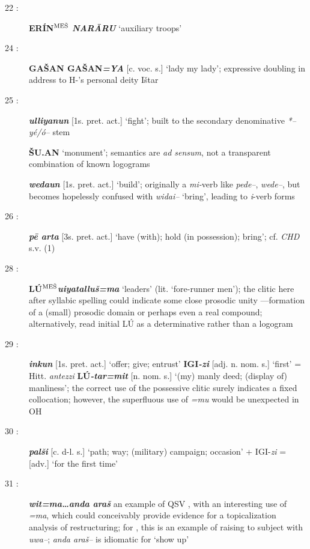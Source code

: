 \documentclass[10pt]{article}
\newcommand{\supersc}[1]{$^{\textrm{\scriptsize{#1}}}$}  	%
\newcommand{\bit}[1]{\textbf{\textit{#1}}}				%
\newcommand{\p}[1]{{\tiny[{#1}]}}					%
\newcommand{\hith}{\textsubwedge{h}}
\newcommand{\mpl}{\supersc{ME\v{S}}}
\newcommand{\troops}{ER\'IN\supersc{ME\v{S}}}
\renewcommand{\.}[1]{\textsubdot{#1}}
\begin{document}
\begin{description}
\item[22 :] \textbf{\troops} \bit{NAR\=ARU} `auxiliary troops'

\item[24 :] \textbf{GA\v{S}AN GA\v{S}AN}\bit{=YA} \p{c. voc. s.} `lady my lady'; expressive doubling in address to H-'s personal deity I\v{s}tar

\item[25 :] \bit{{\hith}ulliyanun} \p{1s. pret. act.} `fight'; built to the secondary denominative \textit{*--y\'e/\'o--} stem 

\textbf{\v{S}U.AN} `monument'; semantics are \textit{ad sensum}, not a transparent combination of known logograms

 \bit{weda{\hith\hith}un} \p{1s. pret. act.} `build'; originally a \textit{mi-}verb like \textit{pede--}, \textit{wede--}, but becomes hopelessly confused with \textit{widai--} `bring', leading to \textit{{\hith}i}-verb forms

\item[26 :] \bit{p\=e {\hith}arta} \p{3s. pret. act.} `have (with); hold (in possession); bring'; cf. \textit{CHD} s.v. (1)

\item[28 :] \textbf{L\'U{\mpl}}\bit{{\hith}uiyatallu\v{s}=ma} `leaders' (lit. `fore-runner men'); the clitic here after syllabic spelling could indicate some close prosodic unity ---formation of a (small) prosodic domain or perhaps even a real compound; alternatively, read initial L\'U as a determinative rather than a logogram

\item[29 :] \bit{{\hith}inkun} \p{1s. pret. act.} `offer; give; entrust' \textbf{IGI}\bit{-zi} \p{adj. n. nom. s.} `first' = Hitt. \textit{{\hith}antezzi} \textbf{L\'U}\bit{-tar=mit} \p{n. nom. s.} `(my) manly deed; (display of) manliness'; the correct use of the possessive clitic surely indicates a fixed collocation; however, the superfluous use of \textit{=mu} would be unexpected in OH

\item[30 :] \bit{pal\v{s}i} \p{c. d-l. s.} `path; way; (military) campaign; occasion' + IGI-\textit{zi} = \p{adv.} `for the first time'

\item[31 :] \bit{wit=ma{\ldots}anda ara\v{s}} an example of QSV , with an interesting use of \textit{=ma}, which could conceivably provide evidence for a topicalization analysis of restructuring; for \citet{koller2013restructuring}, this is an example of raising to subject with \textit{uwa--}; \textit{anda ara\v{s}--} is idiomatic for `show up'


\end{description}
\end{document}
